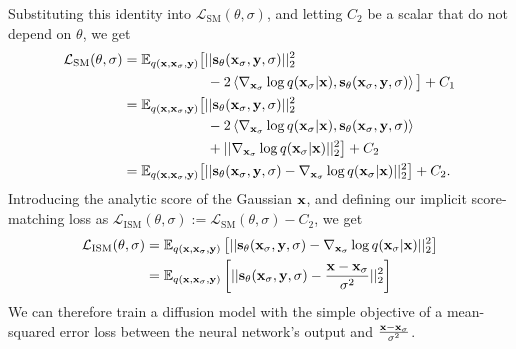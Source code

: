 Substituting this identity into $\mathcal{L}_\text{SM}(\theta, \sigma)$, and letting $C_2$ be a scalar that do not depend on $\theta$, we get
\begin{align}
    \mathcal{L}_\text{SM}(\theta, \sigma) &= \mathbb{E}_{q({\mathbf{x}}, {\mathbf{x}}_\sigma, {\mathbf{y}})} \big[ 
    || {\mathbf{s}}_\theta({\mathbf{x}}_\sigma, {\mathbf{y}}, \sigma) ||_2^2
    \nonumber\\ &\qquad\qquad\qquad
    - 2 \left\langle \nabla_{{\mathbf{x}}_\sigma} \log q({\mathbf{x}}_\sigma|{\mathbf{x}}), {\mathbf{s}}_\theta({\mathbf{x}}_\sigma, {\mathbf{y}}, \sigma) \right\rangle \big] + C_1 \\
    &= \mathbb{E}_{q({\mathbf{x}}, {\mathbf{x}}_\sigma, {\mathbf{y}})} \big[ 
    || {\mathbf{s}}_\theta({\mathbf{x}}_\sigma, {\mathbf{y}}, \sigma) ||_2^2
    \nonumber\\ &\qquad\qquad\qquad
    - 2 \left\langle \nabla_{{\mathbf{x}}_\sigma} \log q({\mathbf{x}}_\sigma|{\mathbf{x}}), {\mathbf{s}}_\theta({\mathbf{x}}_\sigma, {\mathbf{y}}, \sigma) \right\rangle
    \nonumber\\ &\qquad\qquad\qquad
    + || \nabla_{{\mathbf{x}}_\sigma} \log q({\mathbf{x}}_\sigma|{\mathbf{x}}) ||_2^2 \big] + C_2 \\
    &= \mathbb{E}_{q({\mathbf{x}}, {\mathbf{x}}_\sigma, {\mathbf{y}})} \big[ 
    || {\mathbf{s}}_\theta({\mathbf{x}}_\sigma, {\mathbf{y}}, \sigma) - \nabla_{{\mathbf{x}}_\sigma} \log q({\mathbf{x}}_\sigma|{\mathbf{x}}) ||_2^2 \big] + C_2.
\end{align}
Introducing the analytic score of the Gaussian ${\mathbf{x}}$, and defining our implicit score-matching loss as $\mathcal{L}_\text{ISM}(\theta, \sigma) := \mathcal{L}_\text{SM}(\theta, \sigma) - C_2$, we get
\begin{align} \label{eq:ism-loss}
    \mathcal{L}_\text{ISM}(\theta, \sigma) &= \mathbb{E}_{q({\mathbf{x}}, {\mathbf{x}}_\sigma, {\mathbf{y}})} \left[ 
    || {\mathbf{s}}_\theta({\mathbf{x}}_\sigma, {\mathbf{y}}, \sigma) - \nabla_{{\mathbf{x}}_\sigma} \log q({\mathbf{x}}_\sigma|{\mathbf{x}}) ||_2^2 \right] \\
    &= \mathbb{E}_{q({\mathbf{x}}, {\mathbf{x}}_\sigma, {\mathbf{y}})} \left[  \label{eq:ism-loss-ve}
    || {\mathbf{s}}_\theta({\mathbf{x}}_\sigma, {\mathbf{y}}, \sigma) - \frac{{\mathbf{x}}-{\mathbf{x}}_\sigma}{\sigma^2} ||_2^2 \right]
\end{align}
We can therefore train a diffusion model with the simple objective of a mean-squared error loss between the neural network's output and $\frac{{\mathbf{x}}-{\mathbf{x}}_\sigma}{\sigma^2}$.


